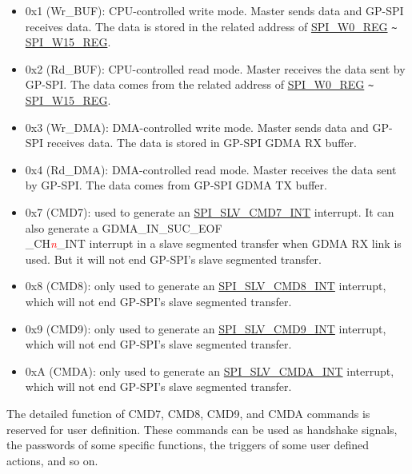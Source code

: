 \documentclass[main\_\_EN.tex]{subfiles}
\begin{document}
\begin{itemize}
    \item \label{cmd:wrbuf} 0x{}1 (Wr\_BUF): CPU-controlled write mode. Master sends data and GP-SPI receives data. The data is stored in the related address of \hyperref[regdesc:SPIW0REG]{SPI\_W0\_REG} \verb+~+ \hyperref[regdesc:SPIW15REG]{SPI\_W15\_REG}.

    \item \label{cmd:rdbuf} 0x{}2 (Rd\_BUF): CPU-controlled read mode. Master receives the data sent by GP-SPI. The data comes from the related address of \hyperref[regdesc:SPIW0REG]{SPI\_W0\_REG} \verb+~+ \hyperref[regdesc:SPIW15REG]{SPI\_W15\_REG}.

    \item \label{cmd:wrdma} 0x{}3 (Wr\_DMA): DMA-controlled write mode. Master sends data and GP-SPI receives data. The data is stored in GP-SPI GDMA RX buffer.

    \item 0x{}4 (Rd\_DMA): DMA-controlled read mode. Master receives the data sent by GP-SPI. The data comes from GP-SPI GDMA TX buffer.

    \item \label{cmd:CMD7} 0x{}7 (CMD7): used to generate an \hyperref[int:SPISLVCMD7INT]{SPI\_SLV\_CMD7\_INT} interrupt. It can also generate a GDMA\_IN\_SUC\_EOF\\\_CH\textcolor{red}{\it{n}}\_INT interrupt in a slave segmented transfer when GDMA RX link is used. But it will not end GP-SPI's slave segmented transfer.

    \item 0x{}8 (CMD8): only used to generate an \hyperref[int:SPISLVCMD8INT]{SPI\_SLV\_CMD8\_INT} interrupt, which will not end GP-SPI's slave segmented transfer.

    \item 0x{}9 (CMD9): only used to generate an \hyperref[int:SPISLVCMD9INT]{SPI\_SLV\_CMD9\_INT} interrupt, which will not end GP-SPI's slave segmented transfer.

    \item 0x{}A (CMDA): only used to generate an \hyperref[int:SPISLVCMDAINT]{SPI\_SLV\_CMDA\_INT} interrupt, which will not end GP-SPI's slave segmented transfer.

\end{itemize}

The detailed function of CMD7, CMD8, CMD9, and CMDA commands is reserved for user definition. These commands can be used as handshake signals, the passwords of some specific functions, the triggers of some user defined actions, and so on.
\end{document}
